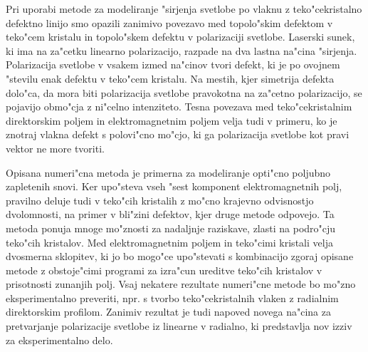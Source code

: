 \documentclass[12pt,twoside,openright,final]{report}
\begin{document}
Pri uporabi metode za modeliranje "sirjenja svetlobe po vlaknu z teko"cekristalno defektno linijo smo opazili zanimivo povezavo med topolo"skim defektom v teko"cem kristalu in topolo"skem defektu v polarizaciji svetlobe. 
Laserski sunek, ki ima na za"cetku linearno polarizacijo, razpade na dva lastna na"cina "sirjenja. 
Polarizacija svetlobe v vsakem izmed na"cinov tvori defekt, ki je po ovojnem "stevilu enak defektu v teko"cem kristalu. 
Na mestih, kjer simetrija defekta dolo"ca, da mora biti polarizacija svetlobe pravokotna na za"cetno polarizacijo, se pojavijo obmo"cja z ni"celno intenziteto. 
Tesna povezava med teko"cekristalnim direktorskim poljem in elektromagnetnim poljem velja tudi v primeru, ko je znotraj vlakna defekt s polovi"cno mo"cjo, ki ga polarizacija svetlobe kot pravi vektor ne more tvoriti. 

Opisana numeri"cna metoda je primerna za modeliranje opti"cno poljubno zapletenih snovi. 
Ker upo"steva vseh "sest komponent elektromagnetnih polj, pravilno deluje tudi v teko"cih kristalih z mo"cno krajevno odvisnostjo dvolomnosti, na primer v bli"zini defektov, kjer druge metode odpovejo. 
Ta metoda ponuja mnoge mo"znosti za nadaljnje raziskave, zlasti na podro"cju teko"cih kristalov. 
Med elektromagnetnim poljem in teko"cimi kristali velja dvosmerna sklopitev, ki jo bo mogo"ce upo"stevati s kombinacijo zgoraj opisane metode z obstoje"cimi programi za izra"cun ureditve teko"cih kristalov v prisotnosti zunanjih polj. 
Vsaj nekatere rezultate numeri"cne metode bo mo"zno eksperimentalno preveriti, npr. s tvorbo teko"cekristalnih vlaken z radialnim direktorskim profilom. 
Zanimiv rezultat je tudi napoved novega na"cina za pretvarjanje polarizacije svetlobe iz linearne v radialno, ki predstavlja nov izziv za eksperimentalno delo. 



\end{document}
